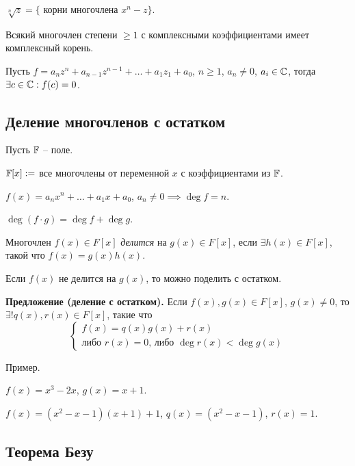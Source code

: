 $\sqrt[n]{z} = \{$ корни многочлена $x^n - z \}$.

\begin{theorem}
    Всякий многочлен степени $\geq 1$ с комплексными коэффициентами имеет комплексный корень.
\end{theorem}

Пусть $f = a_n z^n + a_{n - 1} z^{n - 1} + \dots + a_1 z_1 + a_0$, $n \geq 1$, $a_n \neq 0$, $a_i \in \mathbb{C}$, тогда $\exists c \in \mathbb{C} : f(c) = 0$.

\begin{comment}
    Свойство поля $\CC$, сформулированное в теореме, называется \textit{алгебраической замкнутостью}.
\end{comment}

\subsection{Деление многочленов с остатком}

Пусть $\mathbb{F}$ -- поле.

$\mathbb{F}[x] := $ все многочлены от переменной $x$ с коэффициентами из $\mathbb{F}$.

$f(x) = a_n x^n + \dots + a_1 x + a_0$, $a_n \neq 0 \implies \deg f = n$.

$\deg(f \cdot g) = \deg f + \deg g$.

\begin{definition}
    Многочлен $f(x) \in F[x]$ \textit{делится} на $g(x) \in F[x]$, если $\exists h(x) \in F[x]$, такой что $f(x) = g(x) h(x)$.
\end{definition}

Если $f(x)$ не делится на $g(x)$, то можно поделить с остатком.

\bigskip
\textbf{Предложение (деление с остатком).} Если $f(x), g(x) \in F[x]$, $g(x) \neq 0$, то $\exists! q(x), r(x) \in F[x]$, такие что
\begin{equation*}
    \begin{cases}
        f(x) = q(x) g(x) + r(x) \\
        \text{либо } r(x) = 0 \text{, либо } \deg r(x) < \deg g(x)
    \end{cases}
\end{equation*}

\bigskip
Пример.

$f(x) = x^3 - 2x$, $g(x) = x + 1$.

$f(x) = (x^2 - x - 1)(x + 1) + 1$, $q(x) = (x^2 - x - 1)$, $r(x) = 1$.


\subsection{Теорема Безу}

